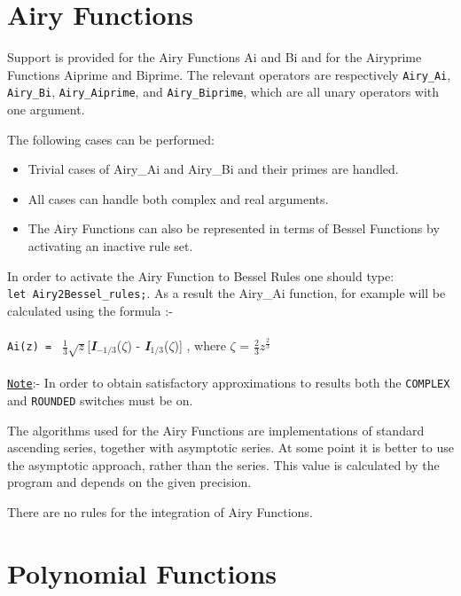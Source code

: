 \section{Airy Functions}

Support is provided for the Airy Functions Ai and Bi and for the
Airyprime Functions Aiprime and Biprime. The relevant operators are
respectively {\tt Airy\_Ai}, {\tt Airy\_Bi}, {\tt Airy\_Aiprime}, and
{\tt Airy\_Biprime}, which are all unary operators with one argument.

The following cases can be performed:

\begin{itemize}
\item Trivial cases of Airy\_Ai and Airy\_Bi and their primes are handled.
\item All cases can handle both complex and real arguments.
\item The Airy Functions can also be represented in terms of Bessel
Functions by activating an inactive rule set.
\end{itemize}

In order to activate the Airy Function to Bessel Rules one should type: \\
{\tt let Airy2Bessel\_rules;}. As a result the Airy\_Ai function,
for example will be calculated using the formula :- \\
\\
{\tt Ai(z) = } $\frac{1}{3}$\( \sqrt{z} \)[{\bf {\sl I}}$_{-1/3}$($\zeta$)
- {\bf {\sl I}}$_{1/3}$({$\zeta$})] , where
 $\zeta$ =  $\frac{2}{3} z^{\frac{2}{3}}$\\
\\
\underline{{\tt Note}}:- In order to obtain satisfactory approximations
to results both the {\tt COMPLEX} and {\tt ROUNDED} switches must be on.

The algorithms used for the Airy Functions are implementations of
standard ascending series, together with asymptotic series. At some
point it is better to use the asymptotic approach, rather than the
series. This value is calculated by the program and depends on the given
precision.

There are no rules for the integration of Airy Functions.

\section{Polynomial Functions}

